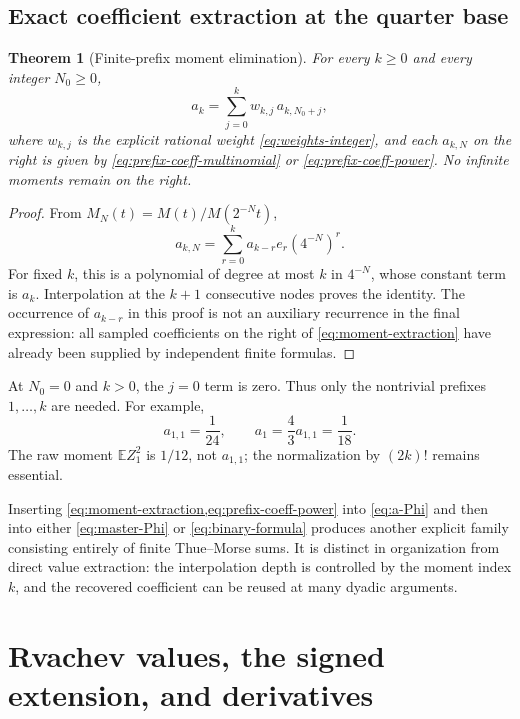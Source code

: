 \documentclass[11pt,a4paper]{article}
\numberwithin{equation}{section}
\newtheorem{theorem}{Theorem}[section]
\theoremstyle{definition}
\theoremstyle{remark}
\newcommand{\E}{\mathbb E}
\begin{document}
\subsection{Exact coefficient extraction at the quarter base}
\begin{theorem}[Finite-prefix moment elimination]
\label{thm:moment-extraction}
For every $k\ge0$ and every integer $N_0\ge0$,
\begin{equation}
 \boxed{\displaystyle
 a_k=\sum_{j=0}^{k}w_{k,j}\,a_{k,N_0+j},}
 \label{eq:moment-extraction}
\end{equation}
where $w_{k,j}$ is the explicit rational weight \cref{eq:weights-integer}, and each $a_{k,N}$ on the right is given by \cref{eq:prefix-coeff-multinomial} or \cref{eq:prefix-coeff-power}. No infinite moments remain on the right.
\end{theorem}
\begin{proof}
From $M_N(t)=M(t)/M(2^{-N}t)$,
\begin{equation}
 a_{k,N}=\sum_{r=0}^{k}a_{k-r}e_r(4^{-N})^r.
 \label{eq:coefficient-scale-polynomial}
\end{equation}
For fixed $k$, this is a polynomial of degree at most $k$ in $4^{-N}$, whose constant term is $a_k$. Interpolation at the $k+1$ consecutive nodes proves the identity. The occurrence of $a_{k-r}$ in this proof is not an auxiliary recurrence in the final expression: all sampled coefficients on the right of \cref{eq:moment-extraction} have already been supplied by independent finite formulas.
\end{proof}
At $N_0=0$ and $k>0$, the $j=0$ term is zero. Thus only the nontrivial prefixes $1,\ldots,k$ are needed. For example,
\[
 a_{1,1}=\frac1{24},\qquad
 a_1=\frac43a_{1,1}=\frac1{18}.
\]
The raw moment $\E Z_1^2$ is $1/12$, not $a_{1,1}$; the normalization by $(2k)!$ remains essential.

Inserting \cref{eq:moment-extraction,eq:prefix-coeff-power} into \cref{eq:a-Phi} and then into either \cref{eq:master-Phi} or \cref{eq:binary-formula} produces another explicit family consisting entirely of finite Thue--Morse sums. It is distinct in organization from direct value extraction: the interpolation depth is controlled by the moment index $k$, and the recovered coefficient can be reused at many dyadic arguments.

\section{Rvachev values, the signed extension, and derivatives}
\label{sec:rvachev}
\end{document}
